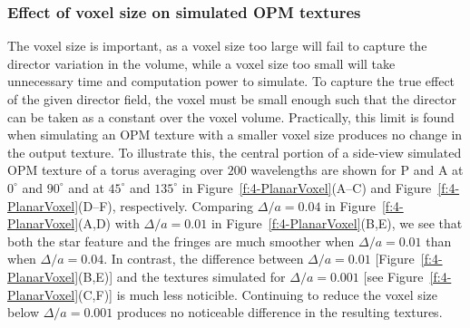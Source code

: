\subsubsection{Effect of voxel size on simulated OPM textures}
The voxel size is important, as a voxel size too large will fail to capture the director variation in the volume, while a voxel size too small will take unnecessary time and computation power to simulate.
To capture the true effect of the given director field, the voxel must be small enough such that the director can be taken as a constant over the voxel volume.
Practically, this limit is found when simulating an OPM texture with a smaller voxel size produces no change in the output texture.
To illustrate this, the central portion of a side-view simulated OPM texture of a torus averaging over $200$ wavelengths are shown for P and A at $0^{\circ}$ and $90^{\circ}$ and at $45^{\circ}$ and $135^{\circ}$ in Figure~\ref{f:4-PlanarVoxel}(A--C) and Figure~\ref{f:4-PlanarVoxel}(D--F), respectively.
Comparing $\Delta /a = 0.04$ in Figure~\ref{f:4-PlanarVoxel}(A,D) with $\Delta /a = 0.01$ in Figure~\ref{f:4-PlanarVoxel}(B,E), we see that both the star feature and the fringes are much smoother when $\Delta /a = 0.01$ than when $\Delta /a = 0.04$.
In contrast, the difference between $\Delta /a = 0.01$ [Figure~\ref{f:4-PlanarVoxel}(B,E)] and the textures simulated for $\Delta /a = 0.001$ [see Figure~\ref{f:4-PlanarVoxel}(C,F)] is much less noticible.
Continuing to reduce the voxel size below $\Delta /a = 0.001$ produces no noticeable difference in the resulting textures.

